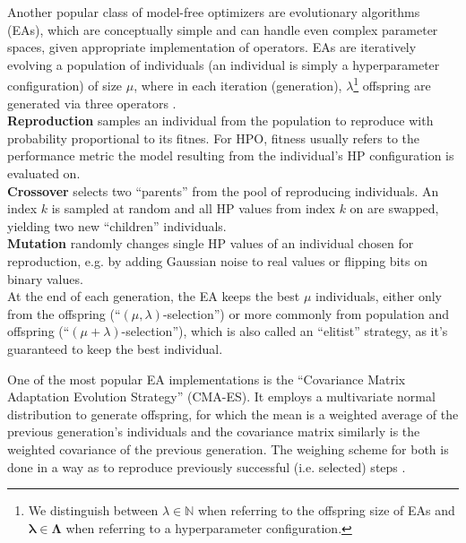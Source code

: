 \documentclass[twoside,11pt]{article}
\begin{document}
Another popular class of model-free optimizers are evolutionary algorithms (EAs), which are conceptually simple and can handle even complex parameter spaces,
given appropriate implementation of operators.
EAs are iteratively evolving a population of individuals (an individual is simply a hyperparameter configuration) of size $\mu$, where in each iteration (generation),
$\lambda$\footnote{We distinguish between $\lambda\in\mathbb{N}$ when referring to the offspring size of EAs and $\boldsymbol\lambda\in\boldsymbol\Lambda$ when
referring to a hyperparameter configuration.} offspring are generated via three operators \citep[pp. 10-14]{genetic_algos}.\\
\textbf{Reproduction} samples an individual from the population to reproduce with probability proportional to its fitnes. For HPO, fitness usually refers to the
performance metric the model resulting from the individual's HP configuration is evaluated on.\\
\textbf{Crossover} selects two ``parents'' from the pool of reproducing individuals. An index $k$ is sampled at random and all HP values from
index $k$ on are swapped, yielding two new ``children'' individuals.\\
\textbf{Mutation} randomly changes single HP values of an individual chosen for reproduction, e.g. by adding Gaussian noise to real values or flipping bits
on binary values.\\
At the end of each generation, the EA keeps the best $\mu$ individuals, either only from the offspring (``$(\mu,\lambda)$-selection'') or more commonly from
population and offspring (``$(\mu+\lambda)$-selection''), which is also called an ``elitist'' strategy, as it's guaranteed to keep the best individual.
\citep[chap. 1.3]{feurer_hyperparameter_2019}

One of the most popular EA implementations is the ``Covariance Matrix Adaptation Evolution Strategy'' (CMA-ES).
It employs a multivariate normal distribution to generate offspring, for which the mean is a weighted average of the previous generation's individuals
and the covariance matrix similarly is the weighted covariance of the previous generation.
The weighing scheme for both is done in a way as to reproduce previously successful (i.e. selected) steps \citep[p. 8-11]{hansen2023cmaevolutionstrategytutorial}.
\end{document}
